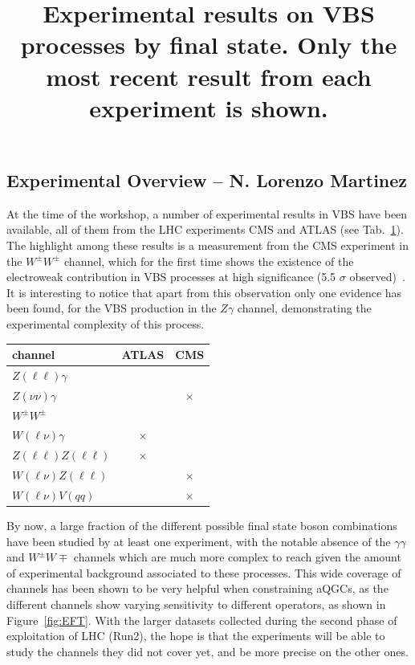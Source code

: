 \label{WG2}

\subsection{Experimental Overview -- N. Lorenzo Martinez}
At the time of the workshop, a number of experimental results in VBS have been available, all of them from the LHC experiments CMS and ATLAS (see Tab.~\ref{tab:wg2:expres}). The highlight among these results is a measurement from the CMS experiment in the $W^\pm W^\pm$ channel, which for the first time shows the existence of the electroweak contribution in VBS processes at high significance (5.5 $\sigma$ observed)~\cite{CMS:2017adb}. It is interesting to notice that apart from this observation only one evidence has been found, for the VBS production in the $Z\gamma$ channel, demonstrating the experimental complexity of this process. 

\begin{table}[htb]
\centering
\label{tab:wg2:expres}
\title{Experimental results on VBS processes by final state. Only the most recent result from each experiment is shown.}
\begin{tabular}{|l|c|c|}
    \hline
    channel & ATLAS & CMS \\
    \hline
    $Z(\ell\ell)\gamma$ & \cite{Aaboud:2017pds} & \cite{Khachatryan:2017jub} \\
    $Z(\nu\nu)\gamma$ &  \cite{Aaboud:2017pds}& $\times$ \\
    $W^\pm W^\pm$ & \cite{Aaboud:2016ffv} & \cite{CMS:2017adb} \\
    $W(\ell\nu)\gamma$ & $\times$ & \cite{Khachatryan:2016vif} \\
    $Z(\ell\ell)Z(\ell\ell)$&  $\times$  & \cite{CMS-PAS-SMP-17-006} \\
    $W(\ell\nu)Z(\ell\ell)$ & \cite{Aad:2016ett} & $\times$ \\
    $W(\ell\nu)V(qq)$ & \cite{Aaboud:2016uuk} & $\times$ \\
    \hline
  \end{tabular}  
\end{table}

By now, a large fraction of the different possible final state boson combinations have been studied by at least one experiment, with the notable absence of the $\gamma\gamma$ and $W^\pm W\mp$ channels which are much more complex to reach given the amount of experimental background associated to these processes. This wide coverage of channels has been shown to be very helpful when constraining aQGCs, as the different channels show varying sensitivity to different operators, as shown in Figure~\ref{fig:EFT}.
With the larger datasets collected during the second phase of exploitation of LHC (Run2), the hope is that the experiments will be able to study the channels they did not cover yet, and be more precise on the other ones. 

